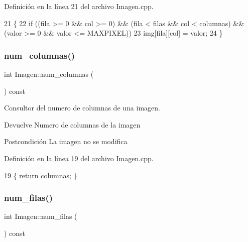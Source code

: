 Definición en la línea 21 del archivo Imagen.\+cpp.


\begin{DoxyCode}
21                                                                 \{
22   \textcolor{keywordflow}{if} ((fila >= 0 && col >= 0) && (fila < filas && col < columnas) && (valor >= 0 && valor <= MAXPIXEL))
23     img[fila][col] = valor;
24 \}
\end{DoxyCode}
\mbox{\label{classImagen_ac28d55c18064aea2a65e6fcf51d86191}} 
\subsubsection{\texorpdfstring{num\+\_\+columnas()}{num\_columnas()}}
{\footnotesize\ttfamily int Imagen\+::num\+\_\+columnas (\begin{DoxyParamCaption}{ }\end{DoxyParamCaption}) const}



Consultor del numero de columnas de una imagen. 

\begin{DoxyReturn}{Devuelve}
Numero de columnas de la imagen 
\end{DoxyReturn}
\begin{DoxyPostcond}{Postcondición}
La imagen no se modifica 
\end{DoxyPostcond}


Definición en la línea 19 del archivo Imagen.\+cpp.


\begin{DoxyCode}
19 \{ \textcolor{keywordflow}{return} columnas; \}
\end{DoxyCode}
\mbox{\label{classImagen_a4cb4faa04f5e2913965e43a6a65acfd1}} 
\subsubsection{\texorpdfstring{num\+\_\+filas()}{num\_filas()}}
{\footnotesize\ttfamily int Imagen\+::num\+\_\+filas (\begin{DoxyParamCaption}{ }\end{DoxyParamCaption}) const}



